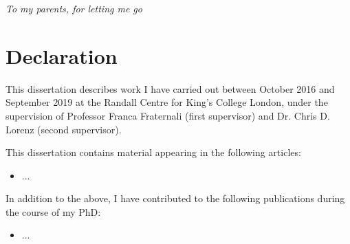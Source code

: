 \cleardoublepage


\makeatletter
\renewcommand{\@pnumwidth}{2em}
\renewcommand{\@tocrmarg}{3em}
\setlength{\cftbeforechapterskip}{.9em}
\makeatother


\thispagestyle{empty}

\begin{vplace}[0.15]

\begin{center}
\it{To my parents, for letting me go}
\end{center} 

\end{vplace}



\cleardoublepage
\newpage
\thispagestyle{plain} %
\mbox{}


\thispagestyle{empty}
\chapter*{Declaration}


\noindent This dissertation describes work I have carried out between October 2016 and September 2019 at the Randall Centre for King's College London, under the supervision of Professor Franca Fraternali (first supervisor) and Dr. Chris D. Lorenz (second supervisor).

\vspace{.2cm}

\noindent This dissertation contains material appearing in the following articles:

\begin{itemize}
\item ...
\end{itemize}

\noindent In addition to the above, I have contributed to the following publications during the course of my PhD:

\begin{itemize}
%
\item ...
%
\end{itemize}
%


